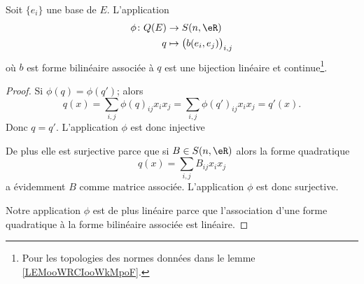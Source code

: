 \begin{proposition} \label{PropFSXooRUMzdb}
	Soit \( \{ e_i \}\) une base de \( E\). L'application
	\begin{equation}
		\begin{aligned}
			\phi\colon Q(E) & \to S(n,\eR)                             \\
			q               & \mapsto \big(   b(e_i,e_j)   \big)_{i,j}
		\end{aligned}
	\end{equation}
	où \( b\) est forme bilinéaire associée à \( q\) est une bijection linéaire et continue\footnote{Pour les topologies des normes données dans le lemme \ref{LEMooWRCIooWkMpoF}.}.
\end{proposition}

\begin{proof}
	Si \( \phi(q)=\phi(q')\); alors
	\begin{equation}
		q(x)=\sum_{i,j}\phi(q)_{ij}x_ix_j=\sum_{i,j}\phi(q')_{ij}x_ix_j=q'(x).
	\end{equation}
	Donc \( q=q'\). L'application \( \phi\) est donc injective

	De plus elle est surjective parce que si \( B\in S(n,\eR)\) alors la forme quadratique
	\begin{equation}
		q(x)=\sum_{i,j}B_{ij}x_ix_j
	\end{equation}
	a évidemment \( B\) comme matrice associée. L'application \( \phi\) est donc surjective.

	Notre application \( \phi\) est de plus linéaire parce que l'association d'une forme quadratique à la forme bilinéaire associée est linéaire.


\end{proof}
